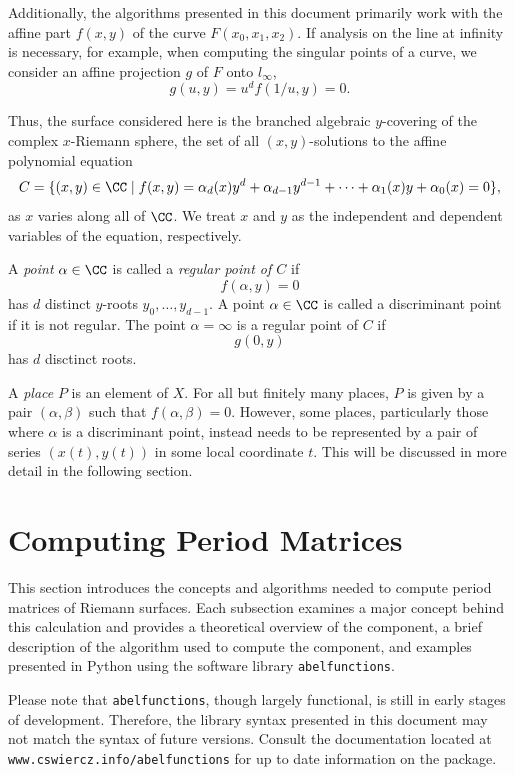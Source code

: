 Additionally, the algorithms presented in this document primarily work
with the affine part $f(x,y)$ of the curve $F(x_0,x_1,x_2)$. If analysis
on the line at infinity is necessary, for example, when computing the
singular points of a curve, we consider an affine projection $g$ of $F$
onto $l_\infty$,
\[
    g(u,y) = u^d f(1/u,y) = 0.
\]

Thus, the surface considered here is the branched algebraic $y$-covering
of the complex $x$-Riemann sphere, the set of all $(x,y)$-solutions to
the affine polynomial equation
\[
    C = \{ (x,y) \in \CC \; | \; f(x,y) = \alpha_d(x)y^d +
    \alpha_{d-1}y^{d-1} + \cdots + \alpha_1(x)y + \alpha_0(x) = 0\},
\]
as $x$ varies along all of $\CC$. We treat $x$ and $y$ as the
independent and dependent variables of the equation, respectively.

A {\it point} $\alpha \in \CC$ is called a {\it regular point of $C$} if
\[
    f(\alpha,y) = 0
\]
has $d$ distinct $y$-roots $y_0,\ldots,y_{d-1}$. A point $\alpha \in
\CC$ is called a discriminant point if it is not regular. The point
$\alpha = \infty$ is a regular point of $C$ if
\[
    g(0,y)
\]
has $d$ disctinct roots.

A {\it place} $P$ is an element of $X$. For all but finitely many
places, $P$ is given by a pair $(\alpha,\beta)$ such that
$f(\alpha,\beta) = 0$. However, some places, particularly those where
$\alpha$ is a discriminant point, instead needs to be represented by a
pair of series $(x(t),y(t))$ in some local coordinate $t$. This will be
discussed in more detail in the following section.
\section{Computing Period Matrices}

This section introduces the concepts and algorithms needed to compute
period matrices of Riemann surfaces. Each subsection examines a major
concept behind this calculation and provides a theoretical overview of
the component, a brief description of the algorithm used to compute the
component, and examples presented in Python using the software library
{\tt abelfunctions}.

Please note that {\tt abelfunctions}, though largely functional, is
still in early stages of development. Therefore, the library syntax
presented in this document may not match the syntax of future
versions. Consult the documentation located at
\verb=www.cswiercz.info/abelfunctions= for up to date information on the
package.

